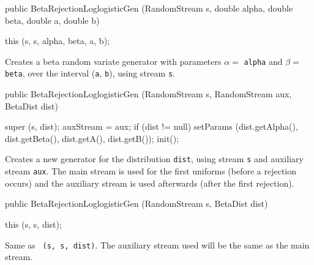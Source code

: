 \begin{code}

   public BetaRejectionLoglogisticGen (RandomStream s,
          double alpha, double beta, double a, double b) \begin{hide} {
      this (s, s, alpha, beta, a, b);
   }\end{hide}
\end{code} 
\begin{tabb} Creates a beta random variate generator with parameters $\alpha =$ 
 \texttt{alpha} and $\beta =$ \texttt{beta},  over the interval
 (\texttt{a}, \texttt{b}), using stream \texttt{s}.
\end{tabb}
\begin{code}

   public BetaRejectionLoglogisticGen (RandomStream s, RandomStream aux, 
                                       BetaDist dist) \begin{hide} {
      super (s, dist);
      auxStream = aux;
      if (dist != null)
         setParams (dist.getAlpha(), dist.getBeta(), dist.getA(), dist.getB());
      init();
   }\end{hide}
\end{code}
\begin{tabb}  Creates a new generator for the distribution \texttt{dist},
     using  stream \texttt{s} and auxiliary stream \texttt{aux}.
     The main stream is used for the first uniforms (before a rejection occurs)
     and the auxiliary stream is used afterwards (after the first rejection).
\end{tabb}
\begin{code}

   public BetaRejectionLoglogisticGen (RandomStream s, BetaDist dist)\begin{hide} {
      this (s, s, dist);
   }\end{hide}
\end{code}
\begin{tabb}
    Same as ~\texttt{(s, s, dist)}.
    The auxiliary stream used will be the same as the main stream.
\end{tabb}



